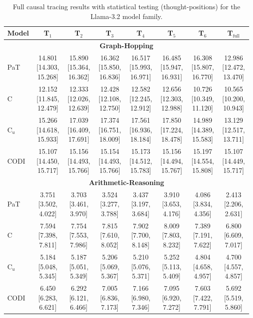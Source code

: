 \begin{table}[h!]
\centering
\tiny
\setlength{\tabcolsep}{2.5pt}
\begin{tabular}{l ccccccc}
\toprule
Model & T$_1$ & T$_2$ & T$_3$ & T$_4$ & T$_5$ & T$_6$ & T$_{\text{full}}$ \\
\midrule
\multicolumn{8}{c}{\textbf{Graph-Hopping}} \\
\midrule
PaT & 14.801 [14.303, 15.268] & 15.890 [15.364, 16.362] & 16.362 [15.850, 16.836] & 16.517 [15.993, 16.971] & 16.485 [15.947, 16.931] & 16.308 [15.807, 16.770] & 12.986 [12.472, 13.470] \\
C & 12.152 [11.845, 12.479] & 12.333 [12.026, 12.639] & 12.428 [12.108, 12.750] & 12.582 [12.245, 12.912] & 12.656 [12.303, 12.988] & 10.726 [10.349, 11.120] & 10.565 [10.200, 10.943] \\
C$_u$ & 15.266 [14.618, 15.933] & 17.039 [16.409, 17.691] & 17.374 [16.751, 18.009] & 17.561 [16.936, 18.184] & 17.850 [17.224, 18.478] & 14.989 [14.389, 15.583] & 13.129 [12.517, 13.711] \\
CODI & 15.107 [14.450, 15.717] & 15.156 [14.493, 15.766] & 15.154 [14.493, 15.766] & 15.173 [14.512, 15.783] & 15.156 [14.494, 15.767] & 15.197 [14.554, 15.808] & 15.107 [14.449, 15.717] \\
\midrule
\multicolumn{8}{c}{\textbf{Arithmetic-Reasoning}} \\
\midrule
PaT & 3.751 [3.502, 4.022] & 3.703 [3.461, 3.970] & 3.524 [3.277, 3.788] & 3.437 [3.197, 3.684] & 3.910 [3.653, 4.176] & 4.086 [3.834, 4.356] & 2.413 [2.206, 2.631] \\
C & 7.594 [7.398, 7.811] & 7.754 [7.553, 7.986] & 7.815 [7.610, 8.052] & 7.902 [7.700, 8.148] & 8.009 [7.803, 8.232] & 7.389 [7.191, 7.622] & 6.800 [6.609, 7.017] \\
C$_u$ & 5.184 [5.048, 5.345] & 5.187 [5.051, 5.349] & 5.206 [5.069, 5.367] & 5.210 [5.076, 5.371] & 5.252 [5.113, 5.409] & 4.804 [4.658, 4.957] & 4.700 [4.557, 4.857] \\
CODI & 6.450 [6.283, 6.621] & 6.292 [6.121, 6.466] & 7.005 [6.836, 7.173] & 7.166 [6.980, 7.346] & 7.095 [6.920, 7.272] & 7.603 [7.422, 7.791] & 5.692 [5.519, 5.860] \\
\bottomrule
\end{tabular}
\caption{Full causal tracing results with statistical testing (thought-positions) for the Llama-3.2 model family.}
\label{tab:causal_trace_thought_llama}
\end{table}
